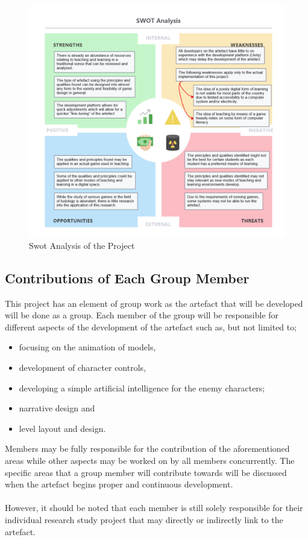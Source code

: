 \begin{figure}[H]
\centering
\includegraphics[scale=1.5]{Figures/swot}
\caption{Swot Analysis of the Project}
\end{figure}

\subsection{Contributions of Each Group Member}
This project has an element of group work as the artefact that will be developed will be done as a group. Each member of the group will be responsible for different aspects of the development of the artefact such as, but not limited to;
\begin{itemize}
\item focusing on the animation of models, 
\item development of character controls, 
\item developing a simple artificial intelligence for the enemy characters;
\item narrative design and 
\item level layout and design. 
\end{itemize}
Members may be fully responsible for the contribution of the aforementioned areas while other aspects may be worked on by all members concurrently. The specific areas that a group member will contribute towards will be discussed when the artefact begins proper and continuous development.
\\\\
However, it should be noted that each member is still solely responsible for their individual research study project that may directly or indirectly link to the artefact.

